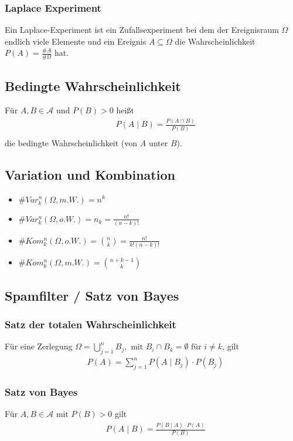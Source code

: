 \documentclass[a4paper]{article}
\begin{document}
\subsubsection{Laplace Experiment}
Ein Laplace-Experiment ist ein Zufallsexperiment bei dem der Ereignisraum $\Omega$ endlich viele Elemente und ein Ereignis $A \subseteq \Omega$ die Wahrscheinlichkeit $P(A) = \frac{\#A}{\#\Omega}$ hat.


\subsection{Bedingte Wahrscheinlichkeit}
Für $A,B \in \mathcal{A}$ und $P(B) > 0$ heißt
\begin{align*}
& P(A \; | \;  B) = \frac{P(A \cap B)}{P(B)} \\
\end{align*}
die bedingte Wahrscheinlichkeit (von $A$ unter $B$).


\subsection{Variation und Kombination}
\begin{itemize}
\item $\# Var_k^n(\Omega, m.W.)  = n^k$
\item $\# Var_k^n(\Omega, o.W.)  = n_k = \frac{n!}{(n-k)!}$  
\item $\#Kom_k^n(\Omega, o.W.) = \binom{n}{k} = \frac{n!}{k! (n-k)!}$  
\item $\#Kom_k^n(\Omega, m.W.)  = \binom{n + k -1}{k}$  
\end{itemize}


\subsection{Spamfilter / Satz von Bayes}

\subsubsection{Satz der totalen Wahrscheinlichkeit}
Für eine Zerlegung  $\Omega = \bigcup_{j=1}^{n} B_j, \text{ mit } B_i \cap B_k = \emptyset \text{ für } i \neq k $, gilt
\begin{align*}
& P(A ) = \sum_{j=1}^{n}  P(A \; | \;  B_j) \cdot P(B_j)
\end{align*}

\subsubsection{Satz von Bayes}
Für $A,B \in \mathcal{A}$ mit  $P(B) > 0$ gilt
\begin{align*}
& P(A \; | \;  B) = \frac{P(B \; | \; A) \cdot P(A)} {P(B)} \\
\end{align*}
\end{document}
